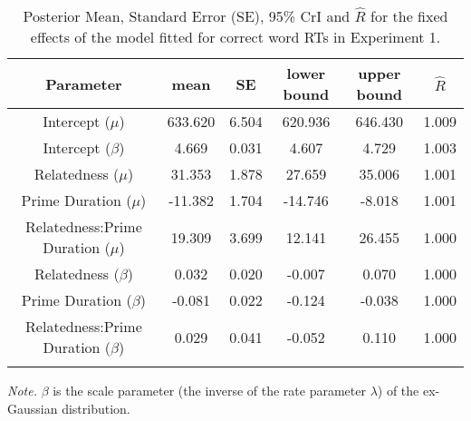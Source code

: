 \documentclass[
  english,
  man,floatsintext]{apa6}
\begin{document}
\begin{table}[H]

\begin{center}
\begin{threeparttable}

\caption{\label{tab:exp1-blmm-table}Posterior Mean, Standard Error (SE), 95\% CrI and \(\hat{R}\) for the fixed effects of the model fitted for correct word RTs in Experiment 1.}

\small{

\begin{tabular}{cccccc}
\toprule
Parameter & \multicolumn{1}{c}{mean} & \multicolumn{1}{c}{SE} & \multicolumn{1}{c}{lower bound} & \multicolumn{1}{c}{upper bound} & \multicolumn{1}{c}{$\hat{R}$}\\
\midrule
Intercept ($\mu$) & 633.620 & 6.504 & 620.936 & 646.430 & 1.009\\
Intercept ($\beta$) & 4.669 & 0.031 & 4.607 & 4.729 & 1.003\\
Relatedness ($\mu$) & 31.353 & 1.878 & 27.659 & 35.006 & 1.001\\
Prime Duration ($\mu$) & -11.382 & 1.704 & -14.746 & -8.018 & 1.001\\
Relatedness:Prime Duration ($\mu$) & 19.309 & 3.699 & 12.141 & 26.455 & 1.000\\
Relatedness ($\beta$) & 0.032 & 0.020 & -0.007 & 0.070 & 1.000\\
Prime Duration ($\beta$) & -0.081 & 0.022 & -0.124 & -0.038 & 1.000\\
Relatedness:Prime Duration ($\beta$) & 0.029 & 0.041 & -0.052 & 0.110 & 1.000\\
\bottomrule
\addlinespace
\end{tabular}

}

\begin{tablenotes}[para]
\normalsize{\textit{Note.} $\beta$ is the scale parameter (the inverse of the rate parameter $\lambda$) of the ex-Gaussian distribution.}
\end{tablenotes}

\end{threeparttable}
\end{center}

\end{table}
\end{document}
